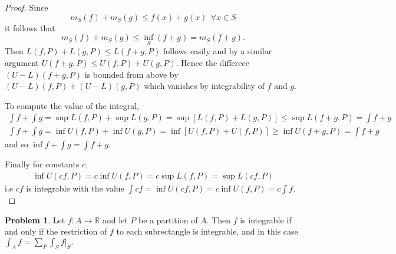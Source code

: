 \documentclass[20pt]{article}
\theoremstyle{plain}
\theoremstyle{definition}
\newtheorem*{problem}{Problem}
\newcommand{\reals}{\mathbb{R}}
\begin{document}
\begin{proof}
  Since 
  $$m_S(f) + m_S(g) \leq f(x) + g(x) \ \ \forall x \in S$$
  it follows that
  $$m_S(f) + m_S(g) \leq \inf_{S}(f + g) = m_S(f + g).$$
  Then $L(f, P) + L(g, P) \leq L(f + g, P)$ follows easily and by a similar argument 
  $U(f + g, P) \leq U(f, P) + U(g, P).$  Hence the differece 
  $(U-L)(f + g, P)$ is bounded from above by $(U-L)(f, P) + (U-L)(g, P)$ 
  which vanishes by integrability of $f$ and $g$.

  To compute the value of the integral, 
  \begin{align*}
    \int f + \int g = \sup L(f, P) + \sup L(g, P) = \sup[ L(f, P) + L(g, P) ] 
    \leq \sup L (f + g, P) = \int f + g \\
    \int f + \int g = \inf U(f, P) + \inf U(g, P) = \inf[ U(f, P) + U(f, P) ]
    \geq \inf U(f + g, P) = \int f + g
  \end{align*}
  and so $\inf f + \int g = \int f + g.$

  Finally for constants $c$, 
  \begin{align*}
    \inf U(cf, P) = c \inf U(f, P) = c \sup L(f, P) = \sup L(cf, P)
  \end{align*}
  i.e $cf$ is integrable with the value 
  $\int cf = \inf U(cf, P) = c \inf U(f, P) = c \int f.$
\end{proof}



\begin{problem}{3.4}
  Let $f: A\to \reals$ and let $P$ be a partition of $A$. Then $f$ is integrable
  if and only if the restriction of $f$ to each subrectangle is integrable, 
  and in this case $\int_A f = \sum_P \int_S f|_S.$
\end{problem}
\end{document}
